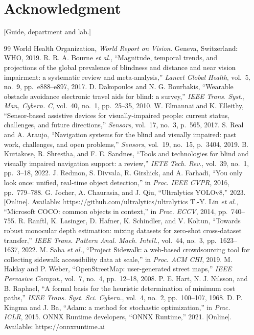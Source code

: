 \documentclass[conference]{IEEEtran}
\newcommand{\tbd}[1]{\textcolor{tbd}{[#1]}}
\begin{document}
\section*{Acknowledgment}
\tbd{Guide, department and lab.}

\begin{thebibliography}{99}\footnotesize
{} World Health Organization, \emph{World Report on Vision}. Geneva, Switzerland: WHO, 2019.
 R. R. A. Bourne \emph{et al.}, ``Magnitude, temporal trends, and projections of the global prevalence of blindness and distance and near vision impairment: a systematic review and meta-analysis,'' \emph{Lancet Global Health}, vol.~5, no.~9, pp.~e888--e897, 2017.
 D. Dakopoulos and N. G. Bourbakis, ``Wearable obstacle avoidance electronic travel aids for blind: a survey,'' \emph{IEEE Trans. Syst., Man, Cybern. C}, vol.~40, no.~1, pp.~25--35, 2010.
 W. Elmannai and K. Elleithy, ``Sensor-based assistive devices for visually-impaired people: current status, challenges, and future directions,'' \emph{Sensors}, vol.~17, no.~3, p.~565, 2017.
 S. Real and A. Araujo, ``Navigation systems for the blind and visually impaired: past work, challenges, and open problems,'' \emph{Sensors}, vol.~19, no.~15, p.~3404, 2019.
 B. Kuriakose, R. Shrestha, and F. E. Sandnes, ``Tools and technologies for blind and visually impaired navigation support: a review,'' \emph{IETE Tech. Rev.}, vol.~39, no.~1, pp.~3--18, 2022.
 J. Redmon, S. Divvala, R. Girshick, and A. Farhadi, ``You only look once: unified, real-time object detection,'' in \emph{Proc. IEEE CVPR}, 2016, pp.~779--788.
 G. Jocher, A. Chaurasia, and J. Qiu, ``Ultralytics YOLOv8,'' 2023. [Online]. Available: https://github.com/ultralytics/ultralytics
 T.-Y. Lin \emph{et al.}, ``Microsoft COCO: common objects in context,'' in \emph{Proc. ECCV}, 2014, pp.~740--755.
 R. Ranftl, K. Lasinger, D. Hafner, K. Schindler, and V. Koltun, ``Towards robust monocular depth estimation: mixing datasets for zero-shot cross-dataset transfer,'' \emph{IEEE Trans. Pattern Anal. Mach. Intell.}, vol.~44, no.~3, pp.~1623--1637, 2022.
 M. Saha \emph{et al.}, ``Project Sidewalk: a web-based crowdsourcing tool for collecting sidewalk accessibility data at scale,'' in \emph{Proc. ACM CHI}, 2019.
 M. Haklay and P. Weber, ``OpenStreetMap: user-generated street maps,'' \emph{IEEE Pervasive Comput.}, vol.~7, no.~4, pp.~12--18, 2008.
 P. E. Hart, N. J. Nilsson, and B. Raphael, ``A formal basis for the heuristic determination of minimum cost paths,'' \emph{IEEE Trans. Syst. Sci. Cybern.}, vol.~4, no.~2, pp.~100--107, 1968.
 D. P. Kingma and J. Ba, ``Adam: a method for stochastic optimization,'' in \emph{Proc. ICLR}, 2015.
 ONNX Runtime developers, ``ONNX Runtime,'' 2021. [Online]. Available: https://onnxruntime.ai
\end{thebibliography}
\end{document}
